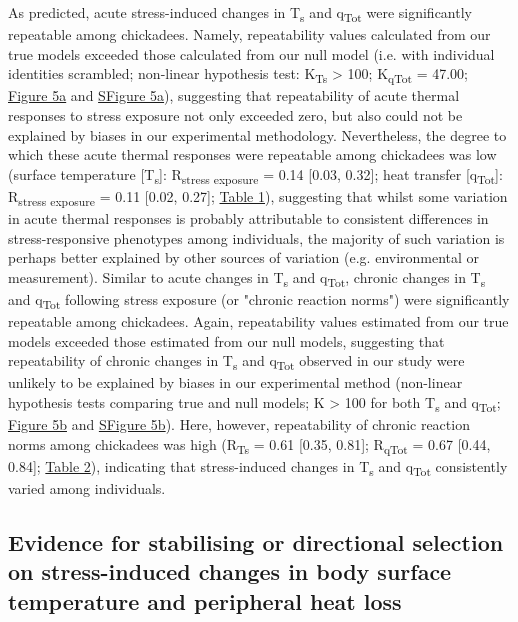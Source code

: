 \documentclass[12pt]{article}
\begin{document}
\noindent As predicted, acute stress-induced changes in T\textsubscript{s} and q\textsubscript{Tot} were significantly repeatable among chickadees. Namely, repeatability values calculated from our true models exceeded those calculated from our null model (i.e. with individual identities scrambled; non-linear hypothesis test: K\textsubscript{Ts} > 100; K\textsubscript{qTot} = 47.00; \hyperref[Fig4.5]{Figure 5a} and \hyperref[FigC.5]{SFigure 5a}), suggesting that repeatability of acute thermal responses to stress exposure not only exceeded zero, but also could not be explained by biases in our experimental methodology. Nevertheless, the degree to which these acute thermal responses were repeatable among chickadees was low (surface temperature [T\textsubscript{s}]: R\textsubscript{stress exposure} = 0.14 [0.03, 0.32]; heat transfer [q\textsubscript{Tot}]: R\textsubscript{stress exposure} = 0.11 [0.02, 0.27]; \hyperref[Tab4.1]{Table 1}), suggesting that whilst some variation in acute thermal responses is probably attributable to consistent differences in stress-responsive phenotypes among individuals, the majority of such variation is perhaps better explained by other sources of variation (e.g. environmental or measurement). Similar to acute changes in T\textsubscript{s} and q\textsubscript{Tot}, chronic changes in T\textsubscript{s} and q\textsubscript{Tot} following stress exposure (or "chronic reaction norms") were significantly repeatable among chickadees. Again, repeatability values estimated from our true models exceeded those estimated from our null models, suggesting that repeatability of chronic changes in T\textsubscript{s} and q\textsubscript{Tot} observed in our study were unlikely to be explained by biases in our experimental method (non-linear hypothesis tests comparing true and null models; K > 100 for both T\textsubscript{s} and q\textsubscript{Tot}; \hyperref[Fig4.5]{Figure 5b} and \hyperref[FigC.5]{SFigure 5b}). Here, however, repeatability of chronic reaction norms among chickadees was high (R\textsubscript{Ts} = 0.61 [0.35, 0.81]; R\textsubscript{qTot} = 0.67 [0.44, 0.84]; \hyperref[Tab4.2]{Table 2}), indicating that stress-induced changes in T\textsubscript{s} and q\textsubscript{Tot} consistently varied among individuals. \vspace{0.5cm}

\subsection{Evidence for stabilising or directional selection on stress-induced changes in body surface temperature and peripheral heat loss}
\vspace{0.5cm}
\end{document}
